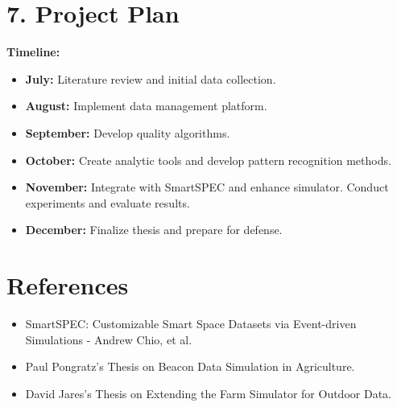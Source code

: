 \documentclass[12pt]{article}
\begin{document}
\section*{7. Project Plan}
\textbf{Timeline:}
\begin{itemize}
    \item \textbf{July:} Literature review and initial data collection.
    \item \textbf{August:} Implement data management platform.
    \item \textbf{September:} Develop quality algorithms.
    \item \textbf{October:} Create analytic tools and develop pattern recognition methods.
    \item \textbf{November:} Integrate with SmartSPEC and enhance simulator. Conduct experiments and evaluate results.
    \item \textbf{December:} Finalize thesis and prepare for defense.
\end{itemize}

\section*{References}
\begin{itemize}
    \item SmartSPEC: Customizable Smart Space Datasets via Event-driven Simulations - Andrew Chio, et al.
    \item Paul Pongratz's Thesis on Beacon Data Simulation in Agriculture.
    \item David Jares's Thesis on Extending the Farm Simulator for Outdoor Data.
\end{itemize}
\end{document}
